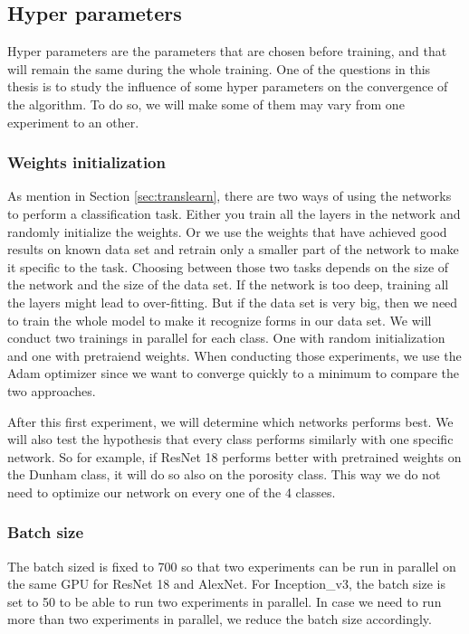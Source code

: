 \subsection{Hyper parameters}
Hyper parameters are the parameters that are chosen before training, and that will remain the same during the whole training. One of the questions in this thesis is to study the influence of some hyper parameters on the  convergence of the algorithm. To do so, we will make some of them may vary from one experiment to an other. 


\subsubsection{Weights initialization} \label{sec:init}
As mention in Section \ref{sec:translearn}, there are two ways of using the networks to perform a classification task. Either you train all the layers in the network and randomly initialize the weights. Or we use the weights that have achieved good results on known data set and retrain only a smaller part of the network to make it specific to the task.
Choosing between those two tasks depends on the size of the network and the size of the data set. If the network is too deep, training all the layers might lead to over-fitting. But if the data set is very big, then we need to train the whole model to make it recognize forms in our data set. 
We will conduct two trainings in parallel for each class. One with random initialization and one with pretraiend weights. 
When conducting those experiments, we use the Adam optimizer since we want to converge quickly to a minimum to compare the two approaches. 

After this first experiment, we will determine which networks performs best. We will also test the hypothesis that every class performs similarly with one specific network. So for example, if ResNet 18 performs better with pretrained weights on the Dunham class, it will do so also on the porosity class. This way we do not need to optimize our network on every one of the 4 classes. 

\subsubsection{Batch size}
The batch sized is fixed to 700 so that two experiments can be run in parallel on the same GPU for ResNet 18 and AlexNet. For Inception\_v3, the batch size is set to 50 to be able to run two experiments in parallel. In case we need to run more than two experiments in parallel, we reduce the batch size accordingly.

